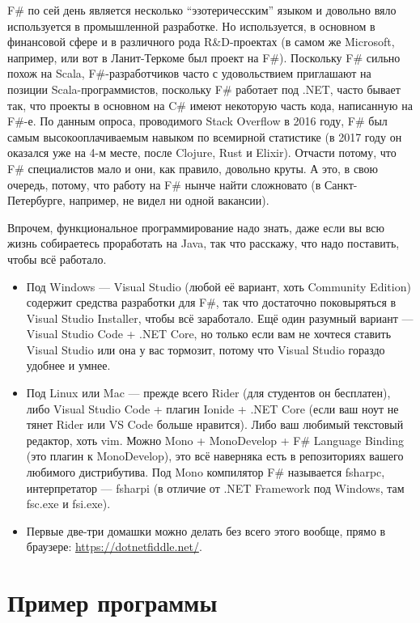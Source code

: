 \documentclass[a5paper]{article}
\begin{document}
F\# по сей день является несколько ``эзотеричесским'' языком и довольно вяло используется в промышленной разработке. Но используется, в основном в финансовой сфере и в различного рода R\&D-проектах (в самом же Microsoft, например, или вот в Ланит-Теркоме был проект на F\#). Поскольку F\# сильно похож на Scala, F\#-разработчиков часто с удовольствием приглашают на позиции Scala-программистов, поскольку F\# работает под .NET, часто бывает так, что проекты в основном на C\# имеют некоторую часть кода, написанную на F\#-е. По данным опроса, проводимого Stack Overflow в 2016 году, F\# был самым высокооплачиваемым навыком по всемирной статистике (в 2017 году он оказался уже на 4-м месте, после Clojure, Rust и Elixir). Отчасти потому, что F\# специалистов мало и они, как правило, довольно круты. А это, в свою очередь, потому, что работу на F\# нынче найти сложновато (в Санкт-Петербурге, например, не видел ни одной вакансии).

Впрочем, функциональное программирование надо знать, даже если вы всю жизнь собираетесь проработать на Java, так что расскажу, что надо поставить, чтобы всё работало.

\begin{itemize}
	\item Под Windows --- Visual Studio (любой её вариант, хоть Community Edition) содержит средства разработки для F\#, так что достаточно поковыряться в Visual Studio Installer, чтобы всё заработало. Ещё один разумный вариант --- Visual Studio Code + .NET Core, но только если вам не хочтеся ставить Visual Studio или она у вас тормозит, потому что Visual Studio гораздо удобнее и умнее.
	\item Под Linux или Mac --- прежде всего Rider (для студентов он бесплатен), либо Visual Studio Code + плагин Ionide + .NET Core (если ваш ноут не тянет Rider или VS Code больше нравится). Либо ваш любимый текстовый редактор, хоть vim. Можно Mono + MonoDevelop + F\# Language Binding (это плагин к MonoDevelop), это всё наверняка есть в репозиториях вашего любимого дистрибутива. Под Mono компилятор F\# называется fsharpc, интерпретатор --- fsharpi (в отличие от .NET Framework под Windows, там fsc.exe и fsi.exe).
	\item Первые две-три домашки можно делать без всего этого вообще, прямо в браузере: \url{https://dotnetfiddle.net/}.
\end{itemize}

\section{Пример программы}
\end{document}
